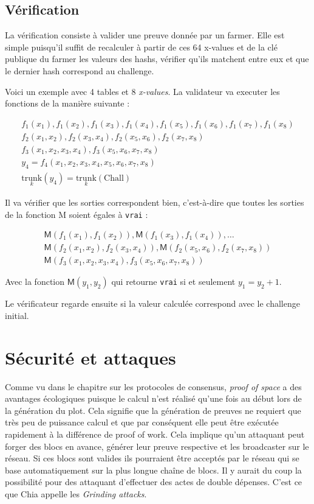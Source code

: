 \subsection{Vérification}

La vérification consiste à valider une preuve donnée par un farmer. Elle est simple puisqu'il suffit de recalculer à partir de ces 64 x-values et de la clé publique du farmer les valeurs des hashs, vérifier qu'ils matchent entre eux et que le dernier hash correspond au challenge.

Voici un exemple avec 4 tables et 8 \emph{x-values}. La validateur va executer les fonctions de la manière suivante :

\begin{gather*}
  f_1(x_1), f_1(x_2), f_1(x_3), f_1(x_4), f_1(x_5), f_1(x_6), f_1(x_7), f_1(x_8) \\
  f_2(x_1,x_2), f_2(x_3,x_4), f_2(x_5,x_6), f_2(x_7,x_8) \\
  f_3(x_1,x_2,x_3,x_4), f_3(x_5,x_6,x_7,x_8) \\
  y_4 = f_4(x_1,x_2,x_3,x_4,x_5,x_6,x_7,x_8) \\
  \underset{k}{\mathrm{trunk}}(y_4)=\underset{k}{\mathrm{trunk}}(\mathrm{Chall})
\end{gather*}

Il va vérifier que les sorties correspondent bien, c'est-à-dire que toutes les sorties de la fonction \textsf{M} soient égales à \texttt{vrai} :

\begin{gather*}
  \mathsf{M}(f_1(x_1), f_1(x_2)),\mathsf{M}(f_1(x_3), f_1(x_4)),\dots \\
  \mathsf{M}(f_2(x_1,x_2),f_2(x_3,x_4)),\mathsf{M}(f_2(x_5,x_6),f_2(x_7,x_8)) \\
  \mathsf{M}(f_3(x_1,x_2,x_3,x_4), f_3(x_5,x_6,x_7,x_8))
\end{gather*}

Avec la fonction $\mathsf{M}(y_1,y_2)$ qui retourne \texttt{vrai} si et seulement $y_1 = y_2 + 1$.

Le vérificateur regarde ensuite si la valeur calculée correspond avec le challenge initial.

\section{Sécurité et attaques}
\label{pospace:security}

Comme vu dans le chapitre sur les protocoles de consensus, \emph{proof of space} a des avantages écologiques puisque le calcul n'est réalisé qu'une fois au début lors de la génération du plot. Cela signifie que la génération de preuves ne requiert que très peu de puissance calcul et que par conséquent elle peut être exécutée rapidement à la différence de proof of work. Cela implique qu'un attaquant peut forger des blocs en avance, générer leur preuve respective et les broadcaster sur le réseau. Si ces blocs sont valides ils pourraient être acceptés par le réseau qui se base automatiquement sur la plus longue chaîne de blocs. Il y aurait du coup la possibilité pour des attaquant d'effectuer des actes de double dépenses. C'est ce que Chia appelle les \emph{Grinding attacks}.

